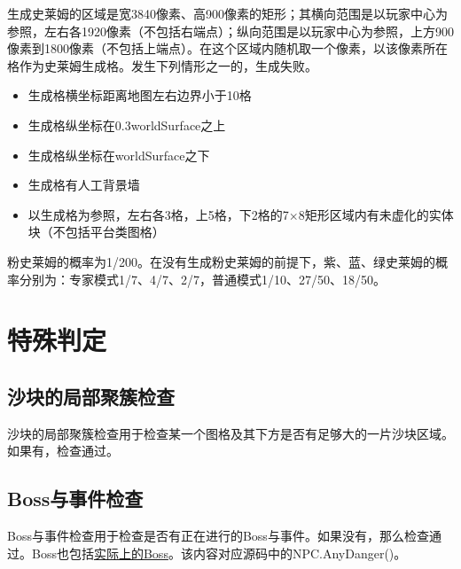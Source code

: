 生成史莱姆的区域是宽3840像素、高900像素的矩形；其横向范围是以玩家中心为参照，左右各1920像素（不包括右端点）；纵向范围是以玩家中心为参照，上方900像素到1800像素（不包括上端点）。在这个区域内随机取一个像素，以该像素所在格作为史莱姆生成格。发生下列情形之一的，生成失败。

\begin{itemize}
    \item 生成格横坐标距离地图左右边界小于10格
    \item 生成格纵坐标在0.3worldSurface之上
    \item 生成格纵坐标在worldSurface之下
    \item 生成格有人工背景墙
    \item 以生成格为参照，左右各3格，上5格，下2格的7$\times$8矩形区域内有未虚化的实体块（不包括平台类图格）
\end{itemize}

粉史莱姆的概率为1/200。在没有生成粉史莱姆的前提下，紫、蓝、绿史莱姆的概率分别为：专家模式1/7、4/7、2/7，普通模式1/10、27/50、18/50。

\section{特殊判定}
\subsection{沙块的局部聚簇检查}
沙块的局部聚簇检查用于检查某一个图格及其下方是否有足够大的一片沙块区域。如果有，检查通过。

\subsection{Boss与事件检查}
Boss与事件检查用于检查是否有正在进行的Boss与事件。如果没有，那么检查通过。Boss也包括\hyperref[app10]{实际上的Boss}。该内容对应源码中的NPC.AnyDanger()。
